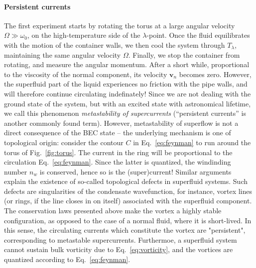 \paragraph{Persistent currents}
%
%
The first experiment starts by rotating the torus at a large angular
velocity $\Omega \gg \omega_0$, on the high-temperature side of the
$\lambda$-point. Once the fluid equilibrates with the motion of the
container walls, we then cool the system through $T_{\lambda}$,
maintaining the same angular velocity $\Omega$. Finally, we stop the
container from rotating, and measure the angular momentum.
%
%
After a short while, proportional to the viscosity of the normal
component, its velocity $\bm{v}_n$ becomes zero. However, the
superfluid part of the liquid experiences no friction with the pipe
walls, and will therefore continue circulating indefinately! Since we
are not dealing with the ground state of the system, but with an
excited state with astronomical lifetime, we call this phenomenon
\textit{metastability of supercurrents} (``persistent currents'' is
another commonly found term).
%
%
However, metastability of superflow is not a direct consequence of the
BEC state -- the underlying mechanism is one of topological origin:
consider the contour $C$ in Eq.~\eqref{eq:feynman} to run around the
torus of Fig.~\ref{fig:torus}. The current in the ring will be
proportional to the circulation Eq.~\eqref{eq:feynman}. Since the
latter is quantized, the windinding number $n_w$ is conserved, hence
so is the (super)current!
%
%
Similar arguments explain the existence of so-called topological
defects in superfluid systems. Such defects are singularities of the
condensate wavefunction, for instance, vortex lines (or rings, if the
line closes in on itself) associated with the superfluid
component. The conservation laws presented above make the vortex a
highly stable configuration, as opposed to the case of a normal fluid,
where it is short-lived. In this sense, the circulating currents which
constitute the vortex are "persistent", corresponding to metastable
supercurrents. Furthermoe, a superfluid system cannot sustain bulk
vorticity due to Eq.~\eqref{eq:vorticity}, and the vortices are
quantized according to Eq.~\eqref{eq:feynman}.

